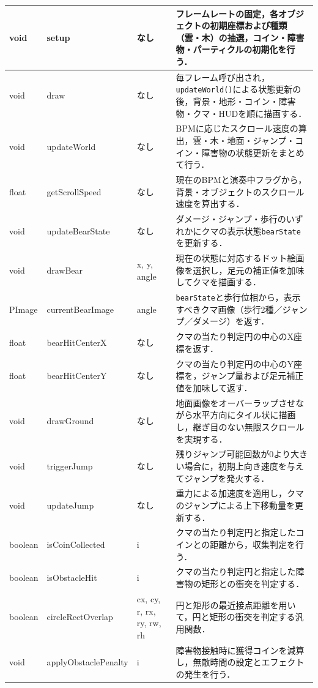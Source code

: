 \documentclass[uplatex,dvipdfmx]{jlreq}
\begin{document}
{\begin{tabularx}{\textwidth}{|M{1.6cm}|M{2.8cm}|M{2.3cm}|Y|}
    void & setup & なし & フレームレートの固定，各オブジェクトの初期座標および種類（雲・木）の抽選，コイン・障害物・パーティクルの初期化を行う． \\ \hline
    void & draw & なし & 毎フレーム呼び出され，\texttt{updateWorld()}による状態更新の後，背景・地形・コイン・障害物・クマ・HUDを順に描画する． \\ \hline
    void & updateWorld & なし & BPMに応じたスクロール速度の算出，雲・木・地面・ジャンプ・コイン・障害物の状態更新をまとめて行う． \\ \hline
    float & getScrollSpeed & なし & 現在のBPMと演奏中フラグから，背景・オブジェクトのスクロール速度を算出する． \\ \hline
    void & updateBearState & なし & ダメージ・ジャンプ・歩行のいずれかにクマの表示状態\texttt{bearState}を更新する． \\ \hline
    void & drawBear & x, y, angle & 現在の状態に対応するドット絵画像を選択し，足元の補正値を加味してクマを描画する． \\ \hline
    PImage & currentBearImage & angle & \texttt{bearState}と歩行位相から，表示すべきクマ画像（歩行2種／ジャンプ／ダメージ）を返す． \\ \hline
    float & bearHitCenterX & なし & クマの当たり判定円の中心のX座標を返す． \\ \hline
    float & bearHitCenterY & なし & クマの当たり判定円の中心のY座標を，ジャンプ量および足元補正値を加味して返す． \\ \hline
    void & drawGround & なし & 地面画像をオーバーラップさせながら水平方向にタイル状に描画し，継ぎ目のない無限スクロールを実現する． \\ \hline
    void & triggerJump & なし & 残りジャンプ可能回数が0より大きい場合に，初期上向き速度を与えてジャンプを発火する． \\ \hline
    void & updateJump & なし & 重力による加速度を適用し，クマのジャンプによる上下移動量を更新する． \\ \hline
    boolean & isCoinCollected & i & クマの当たり判定円と指定したコインとの距離から，収集判定を行う． \\ \hline
    boolean & isObstacleHit & i & クマの当たり判定円と指定した障害物の矩形との衝突を判定する． \\ \hline
    boolean & circleRectOverlap & cx, cy, r, rx, ry, rw, rh & 円と矩形の最近接点距離を用いて，円と矩形の衝突を判定する汎用関数． \\ \hline
    void & applyObstaclePenalty & i & 障害物接触時に獲得コインを減算し，無敵時間の設定とエフェクトの発生を行う． \\ \hline

\end{tabularx}}
\end{document}
